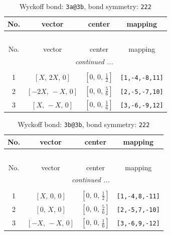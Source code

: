 \documentclass[fleqn,8pt]{jsarticle}
\begin{document}
\renewcommand{\arraystretch}{1.2}
\begin{longtable}{cccc}
\caption{Wyckoff bond: {\tt 3a@3b}, bond symmetry: {\tt 222}}
 \\
 \hline \hline
No. & vector & center & mapping \\ \hline \endfirsthead

\multicolumn{3}{l}{\tablename\ \thetable{}} \\
 \hline \hline
No. & vector & center & mapping \\ \hline \endhead

 \hline \hline
\multicolumn{3}{r}{\footnotesize\it continued ...} \\ \endfoot

 \hline \hline
\multicolumn{3}{r}{} \\ \endlastfoot

1 & $\left[ X,\, 2 X,\, 0 \right]$ & $\left[ 0,\, 0,\, \frac{1}{2} \right]$ & {\tt [1,-4,-8,11]} \\ \hline
2 & $\left[ - 2 X,\, - X,\, 0 \right]$ & $\left[ 0,\, 0,\, \frac{5}{6} \right]$ & {\tt [2,-5,-7,10]} \\ \hline
3 & $\left[ X,\, - X,\, 0 \right]$ & $\left[ 0,\, 0,\, \frac{1}{6} \right]$ & {\tt [3,-6,-9,12]} \\
\end{longtable}
\renewcommand{\arraystretch}{1.2}
\begin{longtable}{cccc}
\caption{Wyckoff bond: {\tt 3b@3b}, bond symmetry: {\tt 222}}
 \\
 \hline \hline
No. & vector & center & mapping \\ \hline \endfirsthead

\multicolumn{3}{l}{\tablename\ \thetable{}} \\
 \hline \hline
No. & vector & center & mapping \\ \hline \endhead

 \hline \hline
\multicolumn{3}{r}{\footnotesize\it continued ...} \\ \endfoot

 \hline \hline
\multicolumn{3}{r}{} \\ \endlastfoot

1 & $\left[ X,\, 0,\, 0 \right]$ & $\left[ 0,\, 0,\, \frac{1}{2} \right]$ & {\tt [1,-4,8,-11]} \\ \hline
2 & $\left[ 0,\, X,\, 0 \right]$ & $\left[ 0,\, 0,\, \frac{5}{6} \right]$ & {\tt [2,-5,7,-10]} \\ \hline
3 & $\left[ - X,\, - X,\, 0 \right]$ & $\left[ 0,\, 0,\, \frac{1}{6} \right]$ & {\tt [3,-6,9,-12]} \\
\end{longtable}
\end{document}
